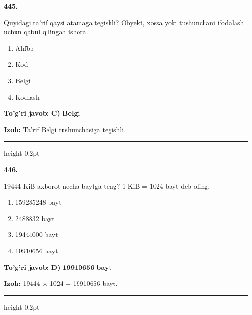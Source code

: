 \documentclass[10pt,a4paper,oneside]{article}
\begin{document}
\noindent\textbf{\color{ink}445.}
\par
Quyidagi ta'rif qaysi atamaga tegishli? Obyekt, xossa yoki tushunchani ifodalash uchun qabul qilingan ishora.
\begin{enumerate}[label=\Alph*),leftmargin=9mm]
\item Alifbo
\item Kod
\item Belgi
\item Kodlash
\end{enumerate}
\begin{tcolorbox}[enhanced,breakable,colback=teal!4,colframe=teal!50!black,boxrule=0.5pt,arc=1.1mm,left=3mm,right=3mm,top=1.7mm,bottom=1.7mm,before skip=2mm,after skip=2mm]
\textbf{\color{teal}To'g'ri javob:} \textbf{C) Belgi}
\par\smallskip
\textbf{Izoh:} Ta'rif Belgi tushunchasiga tegishli.
\end{tcolorbox}
\vspace{2mm}\hrule height 0.2pt \vspace{3mm}

\noindent\textbf{\color{ink}446.}
\par
19444 KiB axborot necha baytga teng? 1 KiB = 1024 bayt deb oling.
\begin{enumerate}[label=\Alph*),leftmargin=9mm]
\item 159285248 bayt
\item 2488832 bayt
\item 19444000 bayt
\item 19910656 bayt
\end{enumerate}
\begin{tcolorbox}[enhanced,breakable,colback=teal!4,colframe=teal!50!black,boxrule=0.5pt,arc=1.1mm,left=3mm,right=3mm,top=1.7mm,bottom=1.7mm,before skip=2mm,after skip=2mm]
\textbf{\color{teal}To'g'ri javob:} \textbf{D) 19910656 bayt}
\par\smallskip
\textbf{Izoh:} 19444 \ensuremath{\times} 1024 = 19910656 bayt.
\end{tcolorbox}
\vspace{2mm}\hrule height 0.2pt \vspace{3mm}
\end{document}
